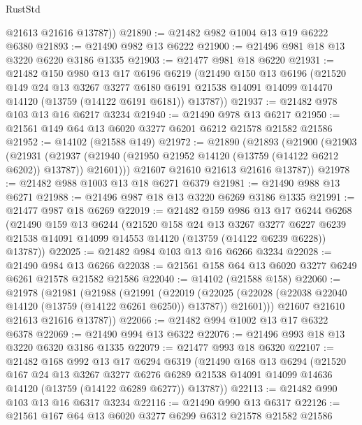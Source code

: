 \begin{lexlean}{RustStd}
\begin{coremodule}
        @21613
        @21616
        @13787))
@21890 := @21482 @982 @1004 @13 @19 @6222 @6380
@21893 := @21490 @982 @13 @6222
@21900 := @21496 @981 @18 @13 @3220 @6220 @3186 @1335
@21903 := @21477 @981 @18 @6220
@21931 := @21482
    @150
    @980
    @13
    @17
    @6196
    @6219
    (@21490
      @150
      @13
      @6196
      (@21520
        @149
        @24
        @13
        @3267
        @3277
        @6180
        @6191
        @21538
        @14091
        @14099
        @14470
        @14120
        (@13759 (@14122 @6191 @6181))
        @13787))
@21937 := @21482 @978 @103 @13 @16 @6217 @3234
@21940 := @21490 @978 @13 @6217
@21950 := @21561 @149 @64 @13 @6020 @3277 @6201 @6212 @21578 @21582 @21586
@21952 := @14102 (@21588 @149)
@21972 := @21890
    (@21893
      (@21900
        (@21903
          (@21931
            (@21937 (@21940 (@21950 @21952 @14120 (@13759 (@14122 @6212 @6202)) @13787)) @21601)))
        @21607
        @21610
        @21613
        @21616
        @13787))
@21978 := @21482 @988 @1003 @13 @18 @6271 @6379
@21981 := @21490 @988 @13 @6271
@21988 := @21496 @987 @18 @13 @3220 @6269 @3186 @1335
@21991 := @21477 @987 @18 @6269
@22019 := @21482
    @159
    @986
    @13
    @17
    @6244
    @6268
    (@21490
      @159
      @13
      @6244
      (@21520
        @158
        @24
        @13
        @3267
        @3277
        @6227
        @6239
        @21538
        @14091
        @14099
        @14553
        @14120
        (@13759 (@14122 @6239 @6228))
        @13787))
@22025 := @21482 @984 @103 @13 @16 @6266 @3234
@22028 := @21490 @984 @13 @6266
@22038 := @21561 @158 @64 @13 @6020 @3277 @6249 @6261 @21578 @21582 @21586
@22040 := @14102 (@21588 @158)
@22060 := @21978
    (@21981
      (@21988
        (@21991
          (@22019
            (@22025 (@22028 (@22038 @22040 @14120 (@13759 (@14122 @6261 @6250)) @13787)) @21601)))
        @21607
        @21610
        @21613
        @21616
        @13787))
@22066 := @21482 @994 @1002 @13 @17 @6322 @6378
@22069 := @21490 @994 @13 @6322
@22076 := @21496 @993 @18 @13 @3220 @6320 @3186 @1335
@22079 := @21477 @993 @18 @6320
@22107 := @21482
    @168
    @992
    @13
    @17
    @6294
    @6319
    (@21490
      @168
      @13
      @6294
      (@21520
        @167
        @24
        @13
        @3267
        @3277
        @6276
        @6289
        @21538
        @14091
        @14099
        @14636
        @14120
        (@13759 (@14122 @6289 @6277))
        @13787))
@22113 := @21482 @990 @103 @13 @16 @6317 @3234
@22116 := @21490 @990 @13 @6317
@22126 := @21561 @167 @64 @13 @6020 @3277 @6299 @6312 @21578 @21582 @21586

\end{coremodule}
\end{lexlean}
